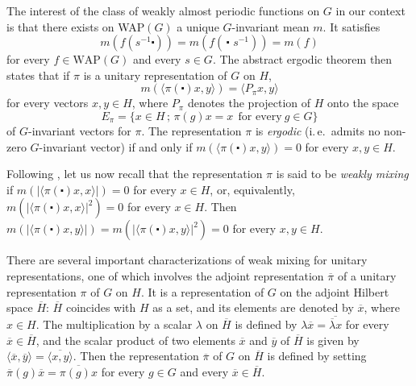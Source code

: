 \documentclass[11pt,english,a4paper]{smfart}
\numberwithin{equation}{section}
\theoremstyle{definition}
\begin{document}
The interest of the class of weakly almost periodic functions on $G$ in 
our context is that there exists on \mbox{WAP$(G)$} a unique $G$-invariant 
mean $m$. It satisfies
\[
m(f(s^{-1}\centerdot))=m(f(\,\centerdot\,\, s^{-1}))=m(f)
\]
for every $f\in\mbox{WAP$(G)$}$ and every $s\in G$.
The abstract ergodic theorem then states that if 
$\pi $ is a unitary representation 
of $G$ on $H$\!, 
\[
m({\ensuremath{{\langle {\pi (\centerdot)x },{y }\rangle}}})={\ensuremath{{\langle {P_{\pi }x },{y }\rangle}}}
\]
for every vectors $x,y\in H$, where $P_{\pi }$ denotes the 
projection of $H$ onto the space
\[
E_{\pi }=\{x  \in H\,;\,\pi (g)x =x \ \ \textrm{for every}\ 
g\in G\}
\]
of $G$-invariant vectors for $\pi $. The representation $\pi $ is \emph{ergodic} 
(i.\,e.\ 
admits no non-zero $G$-invariant vector) if and only if $m({\ensuremath{{\langle {\pi 
(\centerdot)x },{y}\rangle}}})=0$ for every $x,y \in H$.
\par\smallskip 
Following \cite{BR}, let us now recall that the representation 
$\pi $ is said to be \emph{weakly mixing}
if $m(|{\ensuremath{{\langle {\pi (\centerdot)x },{x }\rangle}}}|)=0$ for every $x\in H$, or, equivalently, 
$m(|{\ensuremath{{\langle {\pi (\centerdot)x},{x }\rangle}}}|^{2})=0$ for every $x\in H$. Then 
$m(|{\ensuremath{{\langle {\pi (\centerdot)x },{y }\rangle}}}|)=m(|{\ensuremath{{\langle {\pi (\centerdot)x},{y
}\rangle}}}|^{2})=0$ for every $x,y\in H$.
\par\smallskip 
There are several important characterizations of weak mixing for unitary 
representations, one of which involves the adjoint representation 
${\overline{{\pi}}}$ of a unitary representation 
$\pi $ of $G$ on $H$. It is a representation of $G$ on 
the adjoint Hilbert space ${\overline{{H}}}$: ${\overline{{H}}}$ 
coincides with $H$ as a set, and its elements are denoted by 
${\overline{{x }}}$, where $x\in H$. The multiplication by a scalar 
$\lambda $ on ${\overline{{H}}}$ is defined by $\lambda 
{\overline{{x }}}={\overline{{{\overline{{\lambda }}}x }}}$ for every 
${\overline{{x }}}\in {\overline{{H}}}$, and the scalar product of 
two elements ${\overline{{x}}}$ and ${\overline{{y }}}$ of 
${\overline{{H}}}$ is given by ${\ensuremath{{\langle {{\overline{{x}}}},{{\overline{{y 
}}}}\rangle}}}={\overline{{{\ensuremath{{\langle {x},{y }\rangle}}}}}}$. Then the representation 
${\overline{{\pi }}}$ of $G$ on ${\overline{{H}}}$ 
is defined by setting ${\overline{{\pi}}}(g){\overline{{x}}}={\overline{{\pi (g)x}}}$ for every $g\in G$ and every ${\overline{{x }}}\in 
{\overline{{H}}}$.
\par\smallskip 
\end{document}
